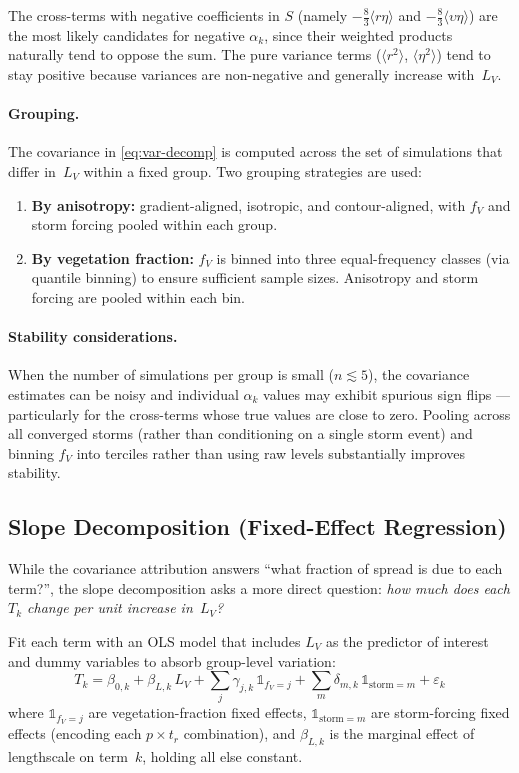 \documentclass[11pt]{article}
\newcommand{\avg}[1]{\langle #1 \rangle}
\begin{document}
The cross-terms with negative coefficients in $S$ (namely
$-\frac{8}{3}\avg{r\eta}$ and $-\frac{8}{3}\avg{\upsilon\eta}$)
are the most likely candidates for negative $\alpha_k$, since their
weighted products naturally tend to oppose the sum.  The pure variance
terms ($\avg{r^2}$, $\avg{\eta^2}$) tend to stay positive because
variances are non-negative and generally increase with~$L_V$.

\paragraph{Grouping.}
The covariance in \eqref{eq:var-decomp} is computed across the
set of simulations that differ in~$L_V$ within a fixed group.
Two grouping strategies are used:
\begin{enumerate}
  \item \textbf{By anisotropy:} gradient-aligned, isotropic, and
    contour-aligned, with $f_V$ and storm forcing pooled within each group.
  \item \textbf{By vegetation fraction:} $f_V$ is binned into three
    equal-frequency classes (via quantile binning) to ensure sufficient
    sample sizes.  Anisotropy and storm forcing are pooled within
    each bin.
\end{enumerate}

\paragraph{Stability considerations.}
When the number of simulations per group is small ($n \lesssim 5$),
the covariance estimates can be noisy and individual $\alpha_k$ values
may exhibit spurious sign flips --- particularly for the cross-terms
whose true values are close to zero.  Pooling across all converged
storms (rather than conditioning on a single storm event) and binning
$f_V$ into terciles rather than using raw levels substantially
improves stability.

\subsection{Slope Decomposition (Fixed-Effect Regression)}

While the covariance attribution answers ``what fraction of spread
is due to each term?'', the slope decomposition asks a more direct
question: \emph{how much does each $T_k$ change per unit increase
in~$L_V$?}

Fit each term with an OLS model that includes $L_V$ as the
predictor of interest and dummy variables to absorb group-level
variation:
\begin{equation}\label{eq:slope-decomp}
  T_k = \beta_{0,k} + \beta_{L,k}\, L_V
        + \sum_j \gamma_{j,k}\,\mathbb{1}_{f_V=j}
        + \sum_m \delta_{m,k}\,\mathbb{1}_{\text{storm}=m}
        + \varepsilon_k
\end{equation}
where $\mathbb{1}_{f_V=j}$ are vegetation-fraction fixed effects,
$\mathbb{1}_{\text{storm}=m}$ are storm-forcing fixed effects
(encoding each $p \times t_r$ combination), and $\beta_{L,k}$ is
the marginal effect of lengthscale on term~$k$, holding all
else constant.
\end{document}
